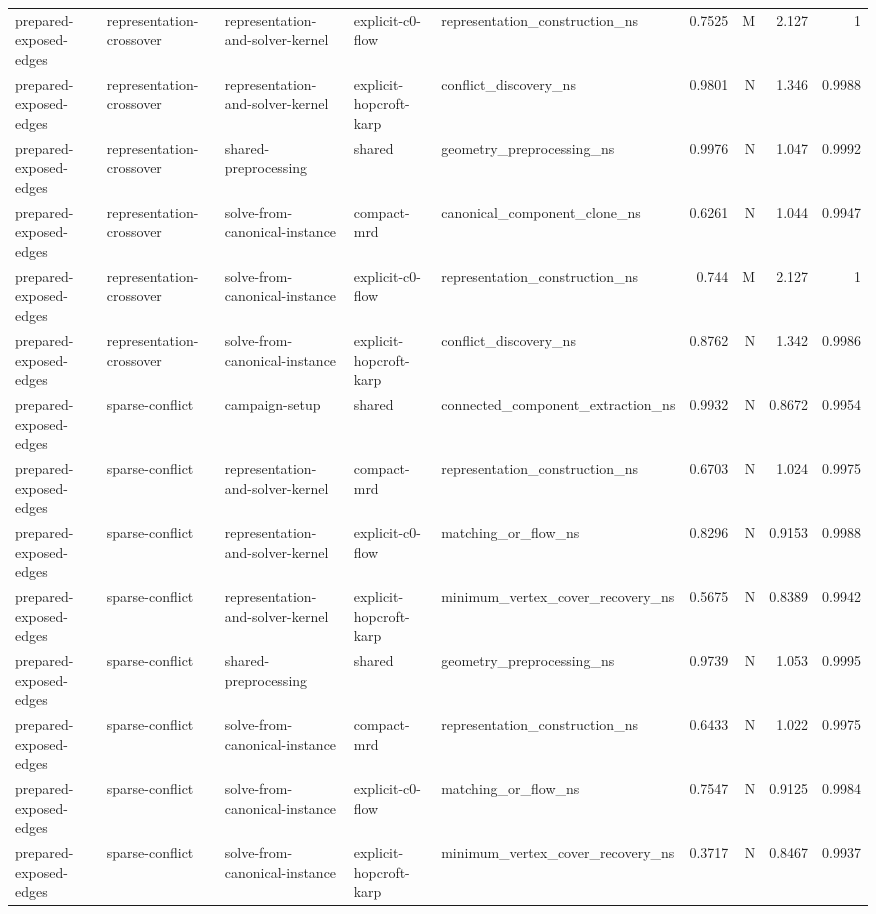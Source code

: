 \begin{table}[t]
\begin{tabular}{lllllrrrr}
prepared-exposed-edges & representation-crossover & representation-and-solver-kernel & explicit-c0-flow & representation\_construction\_ns & 0.7525 & M & 2.127 & 1 \\
prepared-exposed-edges & representation-crossover & representation-and-solver-kernel & explicit-hopcroft-karp & conflict\_discovery\_ns & 0.9801 & N & 1.346 & 0.9988 \\
prepared-exposed-edges & representation-crossover & shared-preprocessing & shared & geometry\_preprocessing\_ns & 0.9976 & N & 1.047 & 0.9992 \\
prepared-exposed-edges & representation-crossover & solve-from-canonical-instance & compact-mrd & canonical\_component\_clone\_ns & 0.6261 & N & 1.044 & 0.9947 \\
prepared-exposed-edges & representation-crossover & solve-from-canonical-instance & explicit-c0-flow & representation\_construction\_ns & 0.744 & M & 2.127 & 1 \\
prepared-exposed-edges & representation-crossover & solve-from-canonical-instance & explicit-hopcroft-karp & conflict\_discovery\_ns & 0.8762 & N & 1.342 & 0.9986 \\
prepared-exposed-edges & sparse-conflict & campaign-setup & shared & connected\_component\_extraction\_ns & 0.9932 & N & 0.8672 & 0.9954 \\
prepared-exposed-edges & sparse-conflict & representation-and-solver-kernel & compact-mrd & representation\_construction\_ns & 0.6703 & N & 1.024 & 0.9975 \\
prepared-exposed-edges & sparse-conflict & representation-and-solver-kernel & explicit-c0-flow & matching\_or\_flow\_ns & 0.8296 & N & 0.9153 & 0.9988 \\
prepared-exposed-edges & sparse-conflict & representation-and-solver-kernel & explicit-hopcroft-karp & minimum\_vertex\_cover\_recovery\_ns & 0.5675 & N & 0.8389 & 0.9942 \\
prepared-exposed-edges & sparse-conflict & shared-preprocessing & shared & geometry\_preprocessing\_ns & 0.9739 & N & 1.053 & 0.9995 \\
prepared-exposed-edges & sparse-conflict & solve-from-canonical-instance & compact-mrd & representation\_construction\_ns & 0.6433 & N & 1.022 & 0.9975 \\
prepared-exposed-edges & sparse-conflict & solve-from-canonical-instance & explicit-c0-flow & matching\_or\_flow\_ns & 0.7547 & N & 0.9125 & 0.9984 \\
prepared-exposed-edges & sparse-conflict & solve-from-canonical-instance & explicit-hopcroft-karp & minimum\_vertex\_cover\_recovery\_ns & 0.3717 & N & 0.8467 & 0.9937 \\

\end{tabular}
\end{table}
